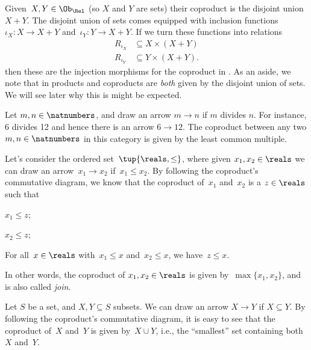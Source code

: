\begin{example}
Given~$X,Y\in \Ob_\Rel$ (so $X$ and $Y$ are sets) their coproduct is the disjoint union~$X+Y$. The disjoint union of sets comes equipped with inclusion functions~$\iota_X\colon X\to X+Y$ and~$\iota_Y\colon Y\to X+Y$. If we turn these functions into relations
\begin{equation*}
\begin{aligned}
    R_{\iota_X}&\subseteq X\times (X+Y)\\
    R_{\iota_Y}&\subseteq Y\times (X+Y).
\end{aligned}
\end{equation*}
then these are the injection morphisms for the coproduct in \Rel.
As an aside, we note that in \Rel products and coproducts are \emph{both} given by the disjoint union of sets. We will see later why this is might be expected.
\end{example}

\begin{example}
Let $m,n\in \natnumbers$, and draw an arrow $m\to n$ if $m$ divides $n$. For instance, 6 divides 12 and hence there is an arrow $6\to 12$. The coproduct between any two $m,n\in \natnumbers$ in this category is given by the least common multiple.
\end{example}

\begin{example}
Let's consider the ordered set~$\tup{\reals,\leq}$, where given $x_1,x_2\in \reals$ we can draw an arrow~$x_1\to x_2$ if~$x_1\leq x_2$. By following the coproduct's commutative diagram, we know that the coproduct of~$x_1$ and~$x_2$ is a $z\in \reals$ such that
\begin{compactitem}
\item $x_1\leq z$;
\item $x_2\leq z$;
\item For all~$x\in \reals$ with~$x_1\leq x$ and~$x_2\leq x$, we have~$z\leq x$.
\end{compactitem}
In other words, the coproduct of $x_1,x_2\in \reals$ is given by~$\max\{x_1,x_2\}$, and is also called \emph{join}.
\end{example}

\begin{example}
\label{ex:subset_coprod}
Let $S$ be a set, and $X,Y\subseteq S$ subsets. We can draw an arrow $X\to Y$ if $X\subseteq Y$. By following the coproduct's commutative diagram, it is easy to see that the coproduct of~$X$ and~$Y$ is given by~$X\cup Y$, i.e., the ``smallest'' set containing both~$X$ and~$Y$.
\end{example}

